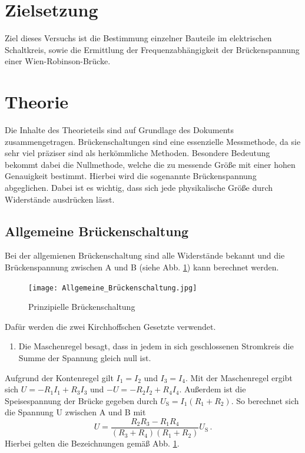 \section{Zielsetzung}
Ziel dieses Versuchs ist die Bestimmung einzelner Bauteile im elektrischen Schaltkreis,
sowie die Ermittlung der Frequenzabhängigkeit der Brückenspannung einer Wien-Robinson-Brücke.

\section{Theorie}
    \label{sec:Theorie}
    Die Inhalte des Theorieteils sind auf Grundlage des Dokuments \cite{V302_Anleitung} zusammengetragen.
    Brückenschaltungen sind eine essenzielle Messmethode, da sie sehr viel präziser sind als herkömmliche Methoden.
    Besondere Bedeutung bekommt dabei die Nullmethode, welche die zu messende Größe mit einer hohen Genauigkeit bestimmt.
    Hierbei wird die sogenannte Brückenspannung abgeglichen.
    Dabei ist es wichtig, dass sich jede physikalische Größe durch Widerstände ausdrücken lässt.
    \subsection{Allgemeine Brückenschaltung}
    Bei der allgemienen Brückenschaltung sind alle Widerstände bekannt und die Brückenspannung zwischen A und B (siehe
    Abb. \ref{fig:All_Brueckenschaltung}) kann berechnet werden.
    \begin{figure}
        \centering
        \texttt{[image: Allgemeine\_Brückenschaltung.jpg]}
        \caption{Prinzipielle Brückenschaltung}
        \label{fig:All_Brueckenschaltung}
    \end{figure}
    Dafür werden die zwei Kirchhoffschen Gesetzte verwendet.
    \begin{enumerate}
        \item Die Maschenregel besagt, dass in jedem in sich geschlossenen Stromkreis die Summe der Spannung gleich null ist.
    \end{enumerate}
    Aufgrund der Kontenregel gilt $I_1 = I_2$ und $I_3 = I_4$.
    Mit der Maschenregel ergibt sich $U = -R_1 I_1 + R_3 I_3$ und $-U = -R_2 I_2 + R_4 I_4$.
    Außerdem ist die Speisespannung der Brücke gegeben durch $U_\text{S} = I_1(R_1 + R_2)$.
    So berechnet sich die Spannung U zwischen A und B mit
    \begin{equation}
        U = \frac{R_2 R_3 - R_1 R_4}{(R_3 + R_4)(R_1 + R_2)}U_{\text{S}} \, \text{.}
        \label{eq:Brueckenspannung}
    \end{equation}
    Hierbei gelten die Bezeichnungen gemäß Abb. \ref{fig:All_Brueckenschaltung}.
